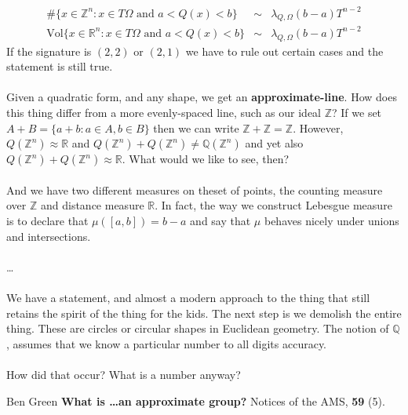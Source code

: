 \documentclass[12pt]{article}
\begin{document}
\begin{eqnarray*}
\#\{ x \in \mathbb{Z}^n : x \in T\Omega \text{ and } a < Q(x) < b \} &\sim & \lambda_{Q, \Omega}(b-a)T^{n-2} \\
\text{Vol}\{ x \in \mathbb{R}^n : x \in T\Omega \text{ and } a < Q(x) < b \} &\sim & \lambda_{Q, \Omega}(b-a)T^{n-2} 
\end{eqnarray*}
If the signature is $(2,2)$ or $(2,1)$ we have to rule out certain cases and the statement is still true. \\ \\
Given a quadratic form, and any shape, we get an \textbf{approximate-line}.  How does this thing differ from a more evenly-spaced line, such as our ideal $\mathbb{Z}$?  If we set $A + B = \{ a + b: a \in A, b \in B\}$ then we can write $\mathbb{Z} + \mathbb{Z} = \mathbb{Z}$.  However, $Q(\mathbb{Z}^n) \approx \mathbb{R}$ and $Q(\mathbb{Z}^n) + Q(\mathbb{Z}^n) \neq \mathbb{Q}(\mathbb{Z}^n)$ and yet also $Q(\mathbb{Z}^n) + Q(\mathbb{Z}^n) \approx \mathbb{R}$.  What would we like to see, then?\\ \\
And we have two different measures on theset of points, the counting measure over $\mathbb{Z}$ and distance measure $\mathbb{R}$.  In fact, the way we construct Lebesgue measure is to declare that $\mu([a,b]) = b-a$ and say that $\mu$ behaves nicely under unions and intersections.  \\ \\ 
\dots  \\ \\
We have a statement, and almost a modern approach to the thing that still retains the spirit of the thing for the kids.  The next step is we demolish the entire thing.  These are circles or circular shapes in Euclidean geometry.  The notion of $\mathbb{Q}$, assumes that we know a particular number to all digits accuracy. \\ \\
How did that occur?  What is a number anyway?

\vfill

\begin{thebibliography}{}

\item Ben Green \textbf{What is \dots an approximate group?} Notices of the AMS, \textbf{59} (5).

\end{thebibliography} 
\end{document}
